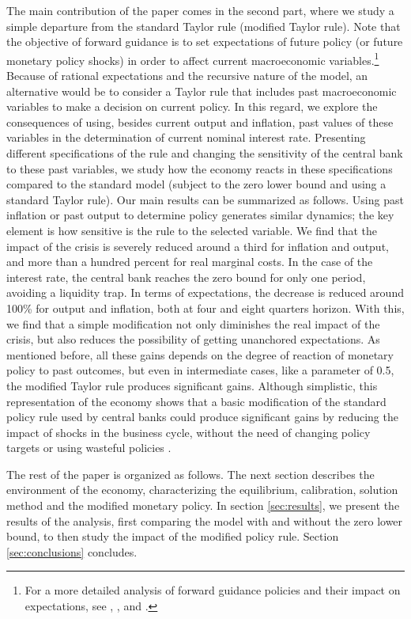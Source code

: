 \documentclass[11pt]{article}
\numberwithin{equation}{section}
\begin{document}
The main contribution of the paper comes in the second part, where we study a simple departure from the standard Taylor rule (modified Taylor rule). Note that the objective of forward guidance is to set expectations of future policy (or future monetary policy shocks) in order to affect current macroeconomic variables.\footnote{For a more detailed analysis of forward guidance policies and their impact on expectations, see \cite{CampbellEtAl2012}, \cite{AndradeEtAl2015}, \cite{BachmannEtAl2015} and \cite{AngeletosEtAl2016}.} Because of rational expectations and the recursive nature of the model, an alternative would be to consider a Taylor rule that includes past macroeconomic variables to make a decision on current policy. In this regard, we explore the consequences of using, besides current output and inflation, past values of these variables in the determination of current nominal interest rate. Presenting different specifications of the rule and changing the sensitivity of the central bank to these past variables, we study how the economy reacts in these specifications compared to the standard model (subject to the zero lower bound and using a standard Taylor rule). Our main results can be summarized as follows. Using past inflation or past output to determine policy generates similar dynamics; the key element is how sensitive is the rule to the selected variable. We find that the impact of the crisis is severely reduced around a third for inflation and output, and more than a hundred percent for real marginal costs. In the case of the interest rate, the central bank reaches the zero bound for only one period, avoiding a liquidity trap. In terms of expectations, the decrease is reduced around 100\% for output and inflation, both at four and eight quarters horizon. With this, we find that a simple modification not only diminishes the real impact of the crisis, but also reduces the possibility of getting unanchored expectations. As mentioned before, all these gains depends on the degree of reaction of monetary policy to past outcomes, but even in intermediate cases, like a parameter of 0.5, the modified Taylor rule produces significant gains. Although simplistic, this representation of the economy shows that a basic modification of the standard policy rule used by central banks could produce significant gains by reducing the impact of shocks in the business cycle, without the need of changing policy targets \citep{CoibionEtAl2012} or using wasteful policies \citep{CorreiaEtAl2013}.

The rest of the paper is organized as follows. The next section describes the environment of the economy, characterizing the equilibrium, calibration, solution method and the modified monetary policy. In section \ref{sec:results}, we present the results of the analysis, first comparing the model with and without the zero lower bound, to then study the impact of the modified policy rule. Section \ref{sec:conclusions} concludes.
\end{document}
